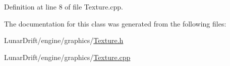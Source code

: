 Definition at line 8 of file Texture.\+cpp.



The documentation for this class was generated from the following files\+:\begin{DoxyCompactItemize}
\item 
Lunar\+Drift/engine/graphics/\hyperlink{_texture_8h}{Texture.\+h}\item 
Lunar\+Drift/engine/graphics/\hyperlink{_texture_8cpp}{Texture.\+cpp}\end{DoxyCompactItemize}
